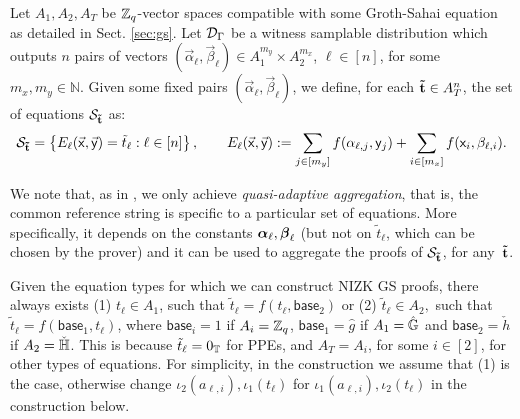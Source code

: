 Let $A_1,A_2,A_T$ be $\mathbb{Z}_q$-vector spaces compatible with some 
Groth-Sahai equation as detailed in Sect.
\ref{sec:gs}.  Let $\mathcal{D}_{\Gamma}$ be a witness samplable distribution which outputs $n$ pairs of vectors 
$(\vec{\alpha}_\ell, \vec{\beta}_\ell) \in A_1^{m_y} \times A_2^{m_x}$, $\ell \in [n]$, for some 
$m_x,m_y \in \mathbb{N}$. Given some fixed pairs $(\vec{\alpha}_\ell,
\vec{\beta}_\ell)$, we define, for each $\mathbf{\tilde{t}} \in A_{T}^{n}$, the set of equations $\mathcal{S}_{\mathbf{\tilde{t}}}$ as:
$$\mathcal{S}_{\mathbf{\tilde{t}}}=\left\{ E_{\ell}(\vec{\mathsf{x}},\vec{\mathsf{y}})=\tilde{t}_{\ell}: \ell \in [n]\right\},  \qquad 
E_{\ell}(\vec{\mathsf{x}},\vec{\mathsf{y}}):=\sum_{j\in[m_y]} f(\alpha_{\ell,j}, \mathsf{y}_j) + 
\sum_{i\in[m_x]}  f(\mathsf{x}_i, \beta_{\ell,i}).$$  

%

We note that, as in \cite{C:JutRoy14}, we only achieve \textit{quasi-adaptive aggregation}, that is, the common reference string is specific to a particular set of equations. More specifically, it depends on the constants ${\boldsymbol \alpha}_{\ell},{\boldsymbol \beta}_{\ell}$ (but not on $\tilde{t}_{\ell}$, which can be chosen by the prover) and it can be used to aggregate the proofs of 
$\mathcal{S}_{\mathbf{\tilde{t}}}$, for any~$\mathbf{\tilde{t}}$.  

Given the equation types for which we can construct NIZK GS proofs, there always exists (1) $t_{\ell} \in A_1$, such that $\tilde{t}_{\ell}=f(t_{\ell},\mathsf{base}_{2})$ or 
 (2) $\tilde{t}_{\ell} \in A_2,$ such that $\tilde{t}_{\ell}=f(\mathsf{base}_{1},t_{\ell})$, where $\mathsf{base}_{i}=1$ if $A_i=\mathbb{Z}_q$, 
 $\mathsf{base}_{1}=\hat{g}$ if $A_1={\hat{\mathbb{G}}}$ and $\mathsf{base}_{2}=\check{h}$ if   $A_2={\check{\mathbb{H}}}$. This is because $\tilde{t}_{\ell}=0_{\mathbb{T}}$ for PPEs, and  $A_{T}=A_{i}$, for some $i \in [2]$, for other types of equations. For simplicity, 
 in the construction we assume that (1) is the case, otherwise 
 change $\iota_2(a_{\ell,i}),  \iota_1(t_{\ell})$ for $\iota_1(a_{\ell,i}),  \iota_2(t_{\ell})$ in the construction below. 

